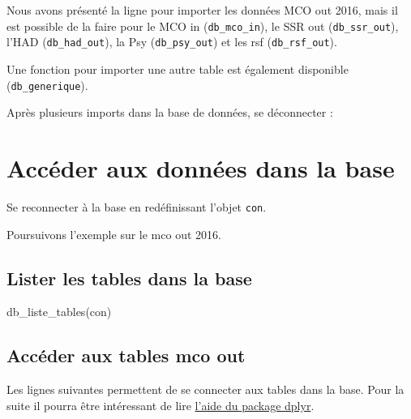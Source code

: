 \documentclass[
]{book}
\newenvironment{Shaded}{\begin{snugshade}}{\end{snugshade}}
\newcommand{\FunctionTok}[1]{\textcolor[rgb]{0.00,0.00,0.00}{#1}}
\newcommand{\NormalTok}[1]{#1}
\newcommand{\SpecialCharTok}[1]{\textcolor[rgb]{0.00,0.00,0.00}{#1}}
\begin{document}
Nous avons présenté la ligne pour importer les données MCO out 2016, mais il est possible de la faire pour le MCO in (\texttt{db\_mco\_in}), le SSR out (\texttt{db\_ssr\_out}), l'HAD (\texttt{db\_had\_out}), la Psy (\texttt{db\_psy\_out}) et les rsf (\texttt{db\_rsf\_out}).

Une fonction pour importer une autre table est également disponible (\texttt{db\_generique}).

Après plusieurs imports dans la base de données, se déconnecter :

\begin{Shaded}
\end{Shaded}

\hypertarget{accuxe9der-aux-donnuxe9es-dans-la-base}{%
\section{Accéder aux données dans la base}\label{accuxe9der-aux-donnuxe9es-dans-la-base}}

Se reconnecter à la base en redéfinissant l'objet \texttt{con}.

Poursuivons l'exemple sur le mco out 2016.

\hypertarget{lister-les-tables-dans-la-base}{%
\subsection{Lister les tables dans la base}\label{lister-les-tables-dans-la-base}}

\begin{Shaded}
\begin{Highlighting}[]
\FunctionTok{db\_liste\_tables}\NormalTok{(con)}
\end{Highlighting}
\end{Shaded}

\hypertarget{accuxe9der-aux-tables-mco-out}{%
\subsection{Accéder aux tables mco out}\label{accuxe9der-aux-tables-mco-out}}

Les lignes suivantes permettent de se connecter aux tables dans la base. Pour la suite il pourra être intéressant de lire \href{http://db.rstudio.com/dplyr/}{l'aide du package dplyr}.
\end{document}
